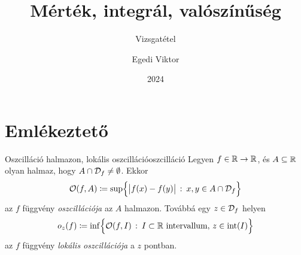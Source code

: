 \documentclass[
]{elteikthesis}[2024/04/26]
\title{Mérték, integrál, valószínűség} %
\subtitle{\circled{2} Vizsgatétel} %
\date{2024} %
\author{Egedi Viktor}
\affiliation{egyetemi tanár} %
\begin{document}
	
	
	\section{Emlékeztető}
	
		\begin{definition}{Oszcilláció halmazon, lokális oszcilláció}{oszcilláció}
		Legyen \( f \in \mathbb{R} \to \mathbb{R} \), és
		\( A \subseteq \mathbb{R} \) olyan halmaz, hogy \( A \cap \mathcal{D}_{f} \neq \emptyset \).
		Ekkor
		\[
			\mathcal{O}(f, A) \coloneq
			\sup \Bigl\{ 
				\abs\big{f(x) - f(y)} \ \colon\, x, y \in A \cap \mathcal{D}_{f}
			\Bigr\}
		\]
		az \( f \) függvény \emph{oszcillációja} az \( A \) halmazon.
		Továbbá egy \( z \in \mathcal{D}_{f} \) helyen
		\[
			o_z(f) \coloneq
			\inf \Bigl\{ 
				\mathcal{O}(f, I) \ \colon\, I \subset \mathbb{R} \text{ intervallum},\, z \in \operatorname{int}(I) 
			\Bigr\}
		\]
		az \( f \) függvény \emph{lokális oszcillációja} a \( z \) pontban.
	\end{definition}
	
	
%	
	
\end{document}
